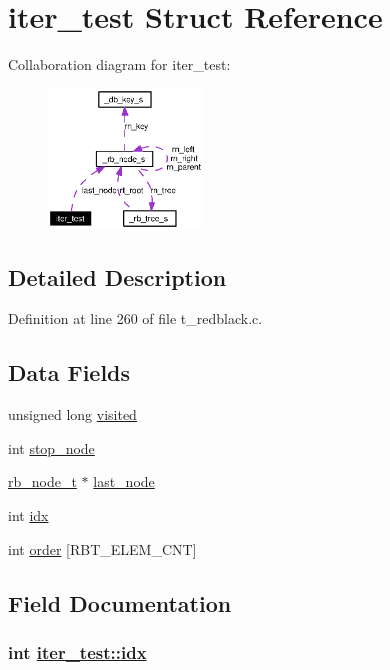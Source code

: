 \hypertarget{structiter__test}{
\section{iter\_\-test Struct Reference}
\label{structiter__test}
}
Collaboration diagram for iter\_\-test:\begin{figure}[H]
\begin{center}
\leavevmode
\includegraphics[width=116pt]{structiter__test__coll__graph}
\end{center}
\end{figure}


\subsection{Detailed Description}




Definition at line 260 of file t\_\-redblack.c.\subsection*{Data Fields}
\begin{CompactItemize}
\item 
unsigned long \hyperlink{structiter__test_o0}{visited}
\item 
int \hyperlink{structiter__test_o1}{stop\_\-node}
\item 
\hyperlink{struct__rb__node__s}{rb\_\-node\_\-t} $\ast$ \hyperlink{structiter__test_o2}{last\_\-node}
\item 
int \hyperlink{structiter__test_o3}{idx}
\item 
int \hyperlink{structiter__test_o4}{order} \mbox{[}RBT\_\-ELEM\_\-CNT\mbox{]}
\end{CompactItemize}


\subsection{Field Documentation}
\hypertarget{structiter__test_o3}{
\subsubsection[idx]{\setlength{\rightskip}{0pt plus 5cm}int \hyperlink{structiter__test_o3}{iter\_\-test::idx}}}
\label{structiter__test_o3}




